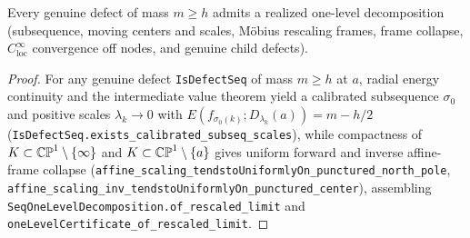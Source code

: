 \begin{theorem}
\label{cert_onelevel}
\leanok
{}
Every genuine defect of mass $m\ge h$ admits a realized one-level decomposition (subsequence,
moving centers and scales, M\"obius rescaling frames, frame collapse, $C^\infty_{\mathrm{loc}}$
convergence off nodes, and genuine child defects).
\end{theorem}
\begin{proof}\leanok For any genuine defect \texttt{IsDefectSeq} of mass $m\ge h$ at $a$, radial energy continuity and the intermediate value theorem yield a calibrated subsequence $\sigma_0$ and positive scales $\lambda_k\to 0$ with $E(f_{\sigma_0(k)};D_{\lambda_k}(a))=m-h/2$ (\texttt{IsDefectSeq.exists\_calibrated\_subseq\_scales}), while compactness of $K\subset\mathbb{CP}^1\setminus\{\infty\}$ and $K\subset\mathbb{CP}^1\setminus\{a\}$ gives uniform forward and inverse affine-frame collapse (\texttt{affine\_scaling\_tendstoUniformlyOn\_punctured\_north\_pole}, \texttt{affine\_scaling\_inv\_tendstoUniformlyOn\_punctured\_center}), assembling \texttt{SeqOneLevelDecomposition.of\_rescaled\_limit} and \texttt{oneLevelCertificate\_of\_rescaled\_limit}.\end{proof}

